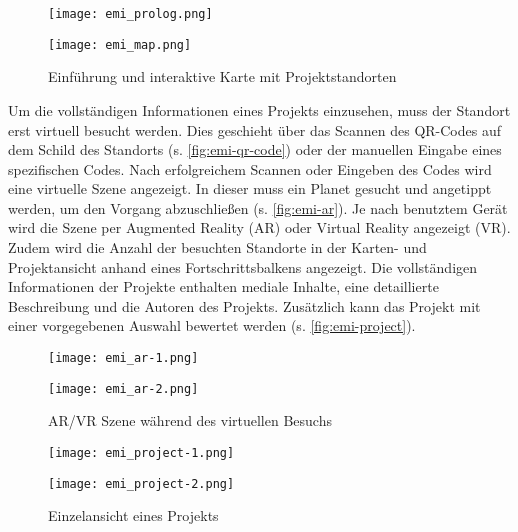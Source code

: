 \begin{figure}[htpb]
    \begin{minipage}{.5\textwidth}
        \centering
        \texttt{[image: emi\_prolog.png]}
    \end{minipage}%
    \begin{minipage}{.5\textwidth}
        \centering
        \texttt{[image: emi\_map.png]}
    \end{minipage}
    \caption{Einführung und interaktive Karte mit Projektstandorten}
    \label{fig:emi-intro-map}
\end{figure}

Um die vollständigen Informationen eines Projekts einzusehen, muss der
Standort erst virtuell besucht werden. Dies geschieht über das Scannen des
QR-Codes auf dem Schild des Standorts (s. \autoref{fig:emi-qr-code}) oder der
manuellen Eingabe eines spezifischen Codes. Nach erfolgreichem Scannen oder
Eingeben des Codes wird eine virtuelle Szene angezeigt. In dieser muss ein
Planet gesucht und angetippt werden, um den Vorgang abzuschließen (s.
\autoref{fig:emi-ar}). Je nach benutztem Gerät wird die Szene per Augmented
Reality (AR) oder Virtual Reality angezeigt (VR). Zudem wird die Anzahl der
besuchten Standorte in der Karten- und Projektansicht anhand eines
Fortschrittsbalkens angezeigt. Die vollständigen Informationen der Projekte
enthalten mediale Inhalte, eine detaillierte Beschreibung und die Autoren des
Projekts. Zusätzlich kann das Projekt mit einer vorgegebenen Auswahl bewertet
werden (s. \autoref{fig:emi-project}).

\begin{figure}[htpb]
    \begin{minipage}{.5\textwidth}
        \centering
        \texttt{[image: emi\_ar-1.png]}
    \end{minipage}%
    \begin{minipage}{.5\textwidth}
        \centering
        \texttt{[image: emi\_ar-2.png]}
    \end{minipage}
    \caption{AR/VR Szene während des virtuellen Besuchs}
    \label{fig:emi-ar}
\end{figure}

\begin{figure}[htpb]
    \begin{minipage}{.5\textwidth}
        \centering
        \texttt{[image: emi\_project-1.png]}
    \end{minipage}%
    \begin{minipage}{.5\textwidth}
        \centering
        \texttt{[image: emi\_project-2.png]}
    \end{minipage}
    \caption{Einzelansicht eines Projekts}
    \label{fig:emi-project}
\end{figure}

